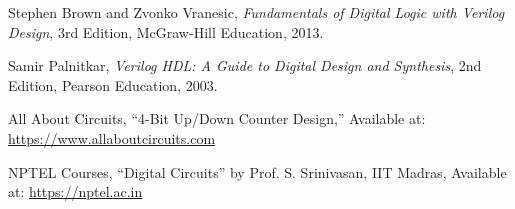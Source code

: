 \documentclass[12pt]{article}
\begin{document}
\begin{thebibliography}{99}
Stephen Brown and Zvonko Vranesic,
\textit{Fundamentals of Digital Logic with Verilog Design},
3rd Edition, McGraw-Hill Education, 2013.

Samir Palnitkar,
\textit{Verilog HDL: A Guide to Digital Design and Synthesis},
2nd Edition, Pearson Education, 2003.

All About Circuits, 
“4-Bit Up/Down Counter Design,” 
Available at: \url{https://www.allaboutcircuits.com}

NPTEL Courses, 
“Digital Circuits” by Prof. S. Srinivasan, IIT Madras,
Available at: \url{https://nptel.ac.in}

\end{thebibliography}
\end{document}
